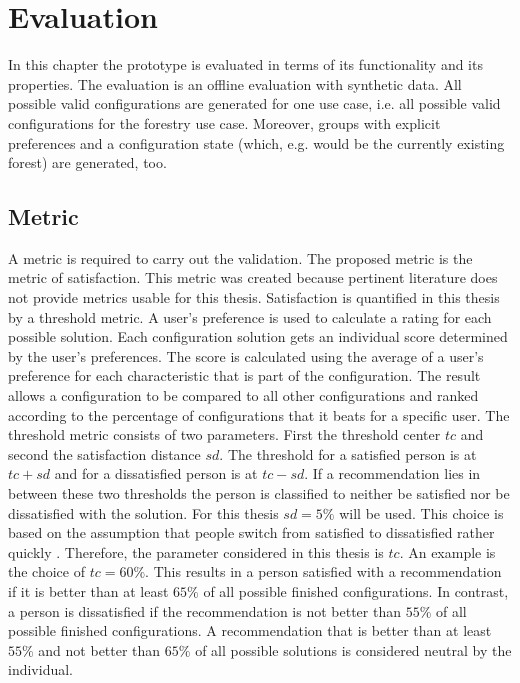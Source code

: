 \chapter{Evaluation}
\label{ch:Evaluation}

In this chapter the prototype is evaluated in terms of its functionality and its properties. The evaluation is an offline evaluation with synthetic data. All possible valid configurations are generated for one use case, i.e. all possible valid configurations for the forestry use case. Moreover, groups with explicit preferences and a configuration state (which, e.g. would be the currently existing forest) are generated, too.

\section{Metric}
\label{sec:Evaluation:Metrics}

A metric is required to carry out the validation. The proposed metric is the metric of satisfaction. This metric was created because pertinent literature does not provide metrics usable for this thesis. Satisfaction is quantified in this thesis by a threshold metric. A user's preference is used to calculate a rating for each possible solution. Each configuration solution gets an individual score determined by the user's preferences. The score is calculated using the average of a user's preference for each characteristic that is part of the configuration. The result allows a configuration to be compared to all other configurations and ranked according to the percentage of configurations that it beats for a specific user. The threshold metric consists of two parameters. First the threshold center $tc$ and second the satisfaction distance $sd$. The threshold for a satisfied person is at $tc + sd$ and for a dissatisfied person is at $tc - sd$. If a recommendation lies in between these two thresholds the person is classified to neither be satisfied nor be dissatisfied with the solution. For this thesis $sd=5\%$ will be used. This choice is based on the assumption that people switch from satisfied to dissatisfied rather quickly . Therefore, the parameter considered in this thesis is $tc$. An example is the choice of $tc = 60\%$. This results in a person satisfied with a recommendation if it is better than at least $65\%$ of all possible finished configurations. In contrast, a person is dissatisfied if the recommendation is not better than $55\%$ of all possible finished configurations. A recommendation that is better than at least $55\%$ and not better than $65\%$ of all possible solutions is considered neutral by the individual.

